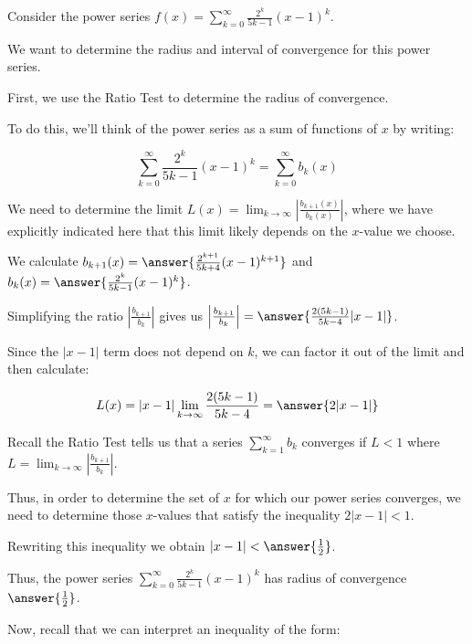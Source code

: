\documentclass{ximera}
\author{Jim Talamo}
\begin{document}
\begin{exercise}
Consider the power series $f(x) = \sum_{k=0}^{\infty} \frac{2^k}{5k-1}(x-1)^{k}$.

We want to determine the radius and interval of convergence for this power series. 

First, we use the Ratio Test to determine the radius of convergence. 

To do this, we'll think of the power series as a sum of functions of $x$ by writing: 

\[
\sum_{k=0}^{\infty} \frac{2^k}{5k-1}(x-1)^{k} = \sum_{k=0}^{\infty} b_k(x)
\]

We need to determine the limit $L(x) = \lim_{k \to \infty} \left| \frac{b_{k+1}(x)}{b_k(x)}\right|$, where we have explicitly indicated here that this limit likely depends on the $x$-value we choose. 

We calculate $b_{k+1}(x)=\answer{\frac{2^{k+1}}{5k+4}(x-1)^{k+1}}$ and $b_k(x)=\answer{ \frac{2^k}{5k-1}(x-1)^k}$. 

\begin{exercise}

Simplifying the ratio $\left|\frac{b_{k+1}}{b_k}\right|$ gives us $\left|\frac{b_{k+1}}{b_k}\right|=\answer{\frac{2(5k-1)}{5k-4} |x-1|}$.


\begin{exercise}

Since the $|x-1|$ term does not depend on $k$, we can factor it out of the limit and then calculate:

\[
L(x) = |x-1| \lim_{k \to \infty}   \frac{2(5k-1)}{5k-4}  =\answer{ 2|x-1|}
\]

\begin{exercise}

Recall the Ratio Test tells us that a series $\sum^{\infty}_{k=1} b_k$ converges if $L <1$ where $L=\lim_{k \to \infty}\left| \frac{b_{k+1}}{b_k}\right|$. 

Thus, in order to determine the set of $x$ for which our power series converges, we need to determine those $x$-values that satisfy the inequality $2|x-1| <1$. 

Rewriting this inequality we obtain $|x-1|< \answer{\frac{1}{2}}$. 

Thus, the  power series $\sum_{k=0}^{\infty} \frac{2^k}{5k-1}(x-1)^{k}$ has radius of convergence $\answer{\frac{1}{2}}$.

\begin{exercise}

Now, recall that we can interpret an inequality of the form:


\end{exercise}
\end{exercise}
\end{exercise}
\end{exercise}
\end{exercise}
\end{document}
